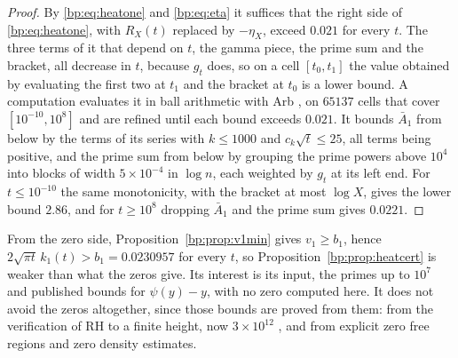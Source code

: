 \begin{proof}
By \eqref{bp:eq:heatone} and \eqref{bp:eq:eta} it suffices that the right side of \eqref{bp:eq:heatone}, with $R_X(t)$ replaced by $-\eta_X$, exceed $0.021$ for every $t$. The three terms of it that depend on $t$, the gamma piece, the prime sum and the bracket, all decrease in $t$, because $g_t$ does, so on a cell $[t_0,t_1]$ the value obtained by evaluating the first two at $t_1$ and the bracket at $t_0$ is a lower bound. A computation evaluates it in ball arithmetic with Arb \cite{Arb}, on $65137$ cells that cover $[10^{-10},10^8]$ and are refined until each bound exceeds $0.021$. It bounds $\bar A_1$ from below by the terms of its series with $k\le1000$ and $c_k\sqrt t\le25$, all terms being positive, and the prime sum from below by grouping the prime powers above $10^4$ into blocks of width $5\times10^{-4}$ in $\log n$, each weighted by $g_t$ at its left end. For $t\le10^{-10}$ the same monotonicity, with the bracket at most $\log X$, gives the lower bound $2.86$, and for $t\ge10^8$ dropping $\bar A_1$ and the prime sum gives $0.0221$.
\end{proof}

From the zero side, Proposition~\ref{bp:prop:v1min} gives $v_1\ge b_1$, hence $2\sqrt{\pi t}\,k_1(t)>b_1=0.0230957$ for every $t$, so Proposition~\ref{bp:prop:heatcert} is weaker than what the zeros give. Its interest is its input, the primes up to $10^7$ and published bounds for $\psi(y)-y$, with no zero computed here. It does not avoid the zeros altogether, since those bounds are proved from them: from the verification of RH to a finite height, now $3\times10^{12}$ \cite{PT21}, and from explicit zero free regions and zero density estimates.

